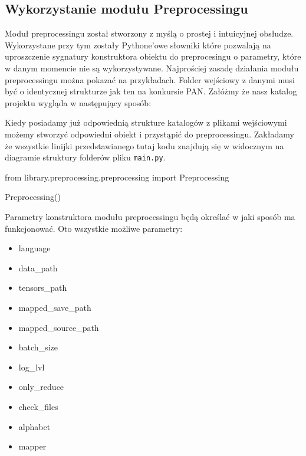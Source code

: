 \newpage
\subsection{Wykorzystanie modułu Preprocessingu}
Moduł preprocessingu został stworzony z myślą o prostej i intuicyjnej obsłudze. Wykorzystane przy
tym zostały Pythone'owe słowniki które pozwalają na uproszczenie sygnatury konstruktora obiektu do preprocesingu
 o parametry, które w danym momencie nie są wykorzystywane. Najprościej zasadę działania modułu preprocessingu można 
pokazać na przykładach. Folder wejściowy z danymi musi być o identycznej strukturze jak ten na 
konkursie PAN.
Załóżmy że nasz katalog projektu wygląda w następujący sposób:


\myspace
{}
\myspace

Kiedy posiadamy już odpowiednią strukture katalogów z plikami wejściowymi możemy stworzyć 
odpowiedni obiekt i przystąpić do preprocessingu. Zakładamy że wszystkie linijki przedstawianego 
tutaj kodu znajdują się w widocznym na diagramie struktury folderów pliku \texttt{main.py}.

\begin{python}
from library.preprocessing.preprocessing import Preprocessing

Preprocessing()

\end{python}

Parametry konstruktora modułu preprocessingu będą określać w jaki sposób ma funkcjonować. 
Oto wszystkie możliwe parametry:
\begin{itemize}
	\item language
	\item data\_path
	\item tensors\_path
	\item mapped\_save\_path
	\item mapped\_source\_path
	\item batch\_size
	\item log\_lvl
	\item only\_reduce
	\item check\_files
	\item alphabet
	\item mapper
\end{itemize}

